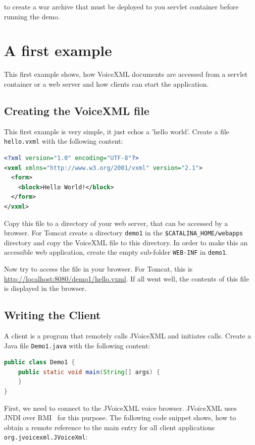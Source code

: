 \documentclass[11pt,a4paper]{article}
\begin{document}
to create a war archive that must be deployed to you servlet container
before running the demo.

\section{A first example}

This first example shows, how VoiceXML documents are accessed from a
servlet container or a web server and how clients can start the application.

\subsection{Creating the VoiceXML file}
\label{sec:hello-vxml}

This first example is very simple, it just echos a 'hello world'.
Create a file \texttt{hello.vxml} with the following content:

\begin{lstlisting}[language=XML]
<?xml version="1.0" encoding="UTF-8"?> 
<vxml xmlns="http://www.w3.org/2001/vxml" version="2.1">
  <form>
    <block>Hello World!</block>
  </form>
</vxml>
\end{lstlisting}

Copy this file to a directory of your web server, that can be accessed
by a browser. For Tomcat create a directory \texttt{demo1} in
the \texttt{\$CATALINA\_HOME/web\-apps} directory and copy the VoiceXML
file to this directory. In order to make this
an accessible web application, create the empty sub-folder \texttt{WEB-INF}
in \texttt{demo1}.

Now try to access the file in your browser. For Tomcat, this is
\url{http://localhost:8080/demo1/hello.vxml}. If all went well, the
contents of this file is displayed in the browser.

\subsection{Writing the Client}

A client is a program that remotely calls JVoiceXML and initiates calls. Create 
a Java file \texttt{Demo1.java} with the following content:

\begin{lstlisting}[language=Java]
public class Demo1 {
    public static void main(String[] args) {
    }
}
\end{lstlisting}

First, we need to connect to the JVoiceXML voice browser. JVoiceXML
uses JNDI over RMI~\cite{sun:rmi,sun:rmi_jndi} for this purpose. 
The following code snippet
shows, how to obtain a remote reference to the main entry for
all client applications \texttt{org.jvoicexml.JVoiceXml}:
\end{document}
